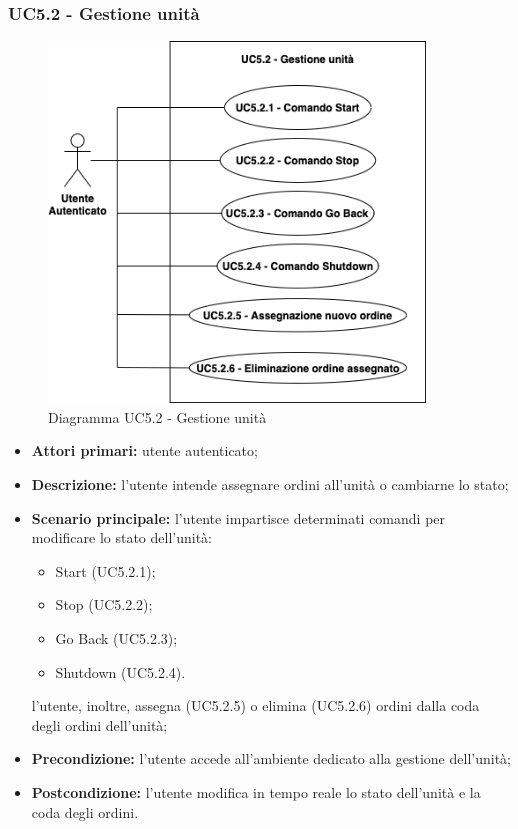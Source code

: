     \subsubsection{UC5.2 - Gestione unità}
    \begin{figure}[h!]
        \centering
        \includegraphics[width=10cm]{images/uc5.2.png}
        \caption{Diagramma UC5.2 - Gestione unità}
    \end{figure}
    \begin{itemize}
        \item \textbf{Attori primari:} utente autenticato;
        \item \textbf{Descrizione:} l'utente intende assegnare ordini all'unità o cambiarne lo stato;
        \item \textbf{Scenario principale:} l'utente impartisce determinati comandi per modificare lo stato dell'unità:
        \begin{itemize}
            \item Start (UC5.2.1);
            \item Stop (UC5.2.2);
            \item Go Back (UC5.2.3);
            \item Shutdown (UC5.2.4).
        \end{itemize}
        l'utente, inoltre, assegna (UC5.2.5) o elimina (UC5.2.6) ordini dalla coda degli ordini dell'unità;
        \item \textbf{Precondizione:} l'utente accede all'ambiente dedicato alla gestione dell'unità;
        \item \textbf{Postcondizione:} l'utente modifica in tempo reale lo stato dell'unità e la coda degli ordini.
    \end{itemize}


